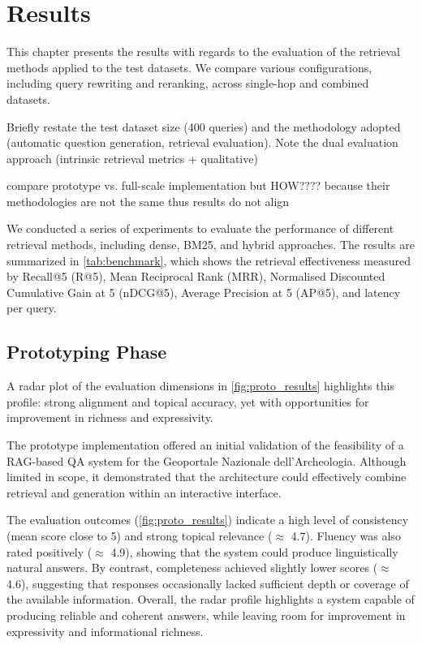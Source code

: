 \chapter{Results}
\label{chap:results}
\begin{spacing}{1.5}

This chapter presents the results with regards to the evaluation of the retrieval methods applied to the test datasets. We compare various configurations, including query rewriting and reranking, across single-hop and combined datasets.

Briefly restate the test dataset size (400 queries) and the methodology adopted (automatic question generation, retrieval evaluation).
Note the dual evaluation approach (intrinsic retrieval metrics + qualitative)

compare prototype vs. full-scale implementation but HOW???? because their methodologies are not the same thus results do not align

We conducted a series of experiments to evaluate the performance of different retrieval methods, including dense, BM25, and hybrid approaches. The results are summarized in \autoref{tab:benchmark}, which shows the retrieval effectiveness measured by Recall@5 (R@5), Mean Reciprocal Rank (MRR), Normalised Discounted Cumulative Gain at 5 (nDCG@5), Average Precision at 5 (AP@5), and latency per query.


\section{Prototyping Phase}

A radar plot of the evaluation dimensions in \autoref{fig:proto_results} highlights this profile: strong alignment and topical accuracy, yet with opportunities for improvement in richness and expressivity.

The prototype implementation offered an initial validation of the feasibility of a RAG-based QA system for the Geoportale Nazionale dell’Archeologia. Although limited in scope, it demonstrated that the architecture could effectively combine retrieval and generation within an interactive interface.

The evaluation outcomes (\autoref{fig:proto_results}) indicate a high level of consistency (mean score close to 5) and strong topical relevance ($\approx$ 4.7). Fluency was also rated positively ($\approx$ 4.9), showing that the system could produce linguistically natural answers. By contrast, completeness achieved slightly lower scores ($\approx$ 4.6), suggesting that responses occasionally lacked sufficient depth or coverage of the available information. Overall, the radar profile highlights a system capable of producing reliable and coherent answers, while leaving room for improvement in expressivity and informational richness.


\end{spacing}
